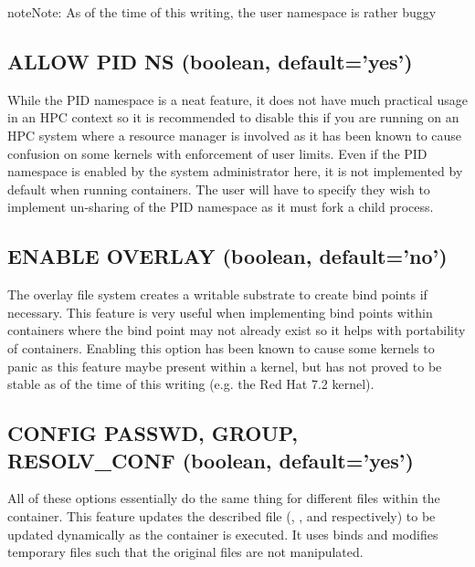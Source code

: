 \documentclass[letterpaper,10pt,english]{sphinxmanual}
\begin{document}
\begin{sphinxadmonition}{note}{Note:}
As of the time of this writing, the user namespace is rather
buggy
\end{sphinxadmonition}


\subsection{ALLOW PID NS (boolean, default=’yes’)}
\label{\detokenize{the_singularity_config_file:allow-pid-ns-boolean-default-yes}}
While the PID namespace is a neat feature, it does not have much
practical usage in an HPC context so it is recommended to disable this
if you are running on an HPC system where a resource manager is
involved as it has been known to cause confusion on some kernels with
enforcement of user limits.
Even if the PID namespace is enabled by the system administrator here,
it is not implemented by default when running containers. The user
will have to specify they wish to implement un-sharing of the PID
namespace as it must fork a child process.


\subsection{ENABLE OVERLAY (boolean, default=’no’)}
\label{\detokenize{the_singularity_config_file:enable-overlay-boolean-default-no}}
The overlay file system creates a writable substrate to create bind
points if necessary. This feature is very useful when implementing bind
points within containers where the bind point may not already exist so
it helps with portability of containers. Enabling this option has been
known to cause some kernels to panic as this feature maybe present
within a kernel, but has not proved to be stable as of the time of this
writing (e.g. the Red Hat 7.2 kernel).


\subsection{CONFIG PASSWD, GROUP, RESOLV\_CONF (boolean, default=’yes’)}
\label{\detokenize{the_singularity_config_file:config-passwd-group-resolv-conf-boolean-default-yes}}
All of these options essentially do the same thing for different files
within the container. This feature updates the described file (,  , and 
respectively) to be updated dynamically as the container is executed. It
uses binds and modifies temporary files such that the original files are
not manipulated.
\end{document}
